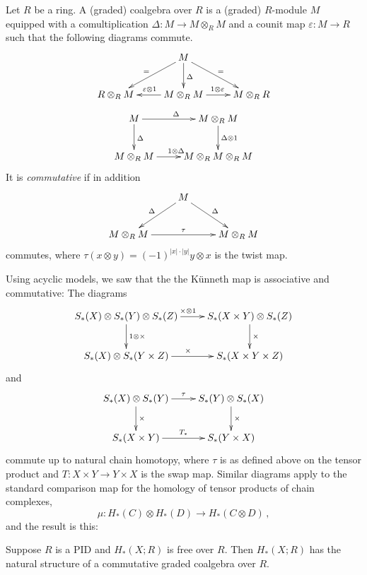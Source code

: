 \begin{definition}
Let $R$ be a ring. A (graded) coalgebra over $R$ is a (graded) $R$-module $M$ equipped with a comultiplication $\Delta:M\to M\otimes_R M$ and a counit map $\varepsilon:M\to R$ such that the following diagrams commute.
\begin{equation*}
\xymatrix{ & M\ar[d]^\Delta\ar[dr]^=\ar[dl]_= & \\
R\otimes_R M & M\otimes_R M\ar[l]_{\varepsilon\otimes 1}\ar[r]^{1\otimes\varepsilon} & M\otimes_R R}
\end{equation*}
\begin{equation*}
\xymatrix{
	M\ar[r]^{\Delta}\ar[d]^{\Delta} & M\otimes_R M\ar[d]^{\Delta\otimes 1}\\
	M\otimes_R M\ar[r]^{1\otimes\Delta} & M\otimes_R M\otimes_R M
}\end{equation*}
It is {\em commutative} if in addition
\begin{equation*}
\xymatrix{
	 & M\ar[dl]_\Delta\ar[dr]^\Delta &\\
	M\otimes_R M\ar[rr]^{\tau} & & M\otimes_R M
}\end{equation*}
commutes, where $\tau(x\otimes y)=(-1)^{|x|\cdot|y|}y\otimes x$ is the twist map.
\end{definition}

Using acyclic models, we saw that the 
the K\"{u}nneth map is associative and commutative: The diagrams
\[
\xymatrix{S_\ast(X)\otimes S_\ast(Y)\otimes S_\ast(Z) \ar[r]^{\times\otimes1}
\ar[d]^{1\otimes\times} & S_\ast(X\times Y)\otimes S_\ast(Z) \ar[d]^{\times} \\
S_\ast(X)\otimes S_\ast(Y\times Z) \ar[r]^\times & S_\ast(X\times Y\times Z)
}\]
and
\begin{equation*}
\xymatrix{S_\ast(X)\otimes S_\ast(Y)\ar[r]^{\tau}\ar[d]^{\times} & S_\ast(Y)\otimes S_\ast(X)\ar[d]^{\times}\\
S_\ast(X\times Y)\ar[r]^{T_\ast} & S_\ast(Y\times X)
}\end{equation*}
commute up to natural chain homotopy, where $\tau$ is as defined above on the tensor product and $T:X\times Y\to Y\times X$ is the swap map. Similar diagrams
apply to the standard comparison map for the homology of tensor products
of chain complexes,
\[
\mu:H_\ast(C)\otimes H_\ast(D)\to H_\ast(C\otimes D)\,,
\]
and the result is this:
\begin{corollary}
Suppose $R$ is a PID and $H_*(X;R)$ is free over $R$. 
Then $ H_\ast(X;R)$ has the natural structure of a commutative graded coalgebra over $R$.
\end{corollary}

